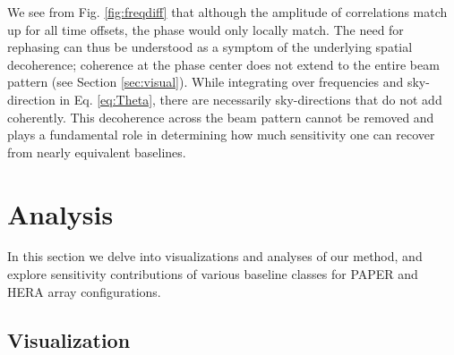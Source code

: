 \documentclass[twocolumn,apj,numberedappendix]{emulateapj}
\renewcommand\[{\begin{equation}}
\renewcommand\]{\end{equation}}
\begin{document}
We see from Fig. \ref{fig:freqdiff} that although the amplitude of correlations match up for all time offsets, the phase would only locally match. The need for rephasing can thus be understood as a symptom of the underlying spatial decoherence; coherence at the phase center does not extend to the entire beam pattern (see Section \ref{sec:visual}). While integrating over frequencies and sky-direction in Eq. \eqref{eq:Theta}, there are necessarily sky-directions that do not add coherently. This decoherence across the beam pattern cannot be removed and plays a fundamental role in determining how much sensitivity one can recover from nearly equivalent baselines. 

\section{Analysis}

In this section we delve into visualizations and analyses of our method, and explore sensitivity contributions of various baseline classes for PAPER and HERA array configurations. 
\subsection{Visualization \label{sec:visual}}
\end{document}
